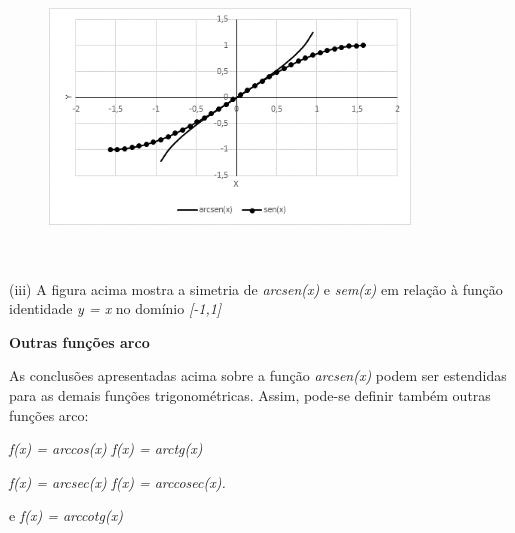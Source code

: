 \begin{texemplo}
\begin{figure}[H]
    \begin{Center}
        \includegraphics[width=3.77in,height=3.01in]{capitulos/trigonometria_e_funcoes_trigonometricas/media/image48.png}
    \end{Center}
\end{figure}

(iii) A figura acima mostra a simetria de \textit{arcsen(x)  }e\textit{ sem(x)} em relação à função identidade \textit{y = x} no domínio\textit{ [-1,1] }\qedsymbol
\end{texemplo}

\textbf{Outras funções arco}

\begin{caixa}
As conclusões apresentadas acima sobre a função \textit{arcsen(x)} podem ser estendidas para as demais funções trigonométricas. Assim, pode-se definir também outras funções arco:

\textit{f(x) =  arccos(x) \tab f(x) =  arctg(x)}

\textit{f(x) =  arcsec(x) \tab f(x) =  arccosec(x).}

\raggedright e \textit{f(x) =  arccotg(x)}
\end{caixa}

